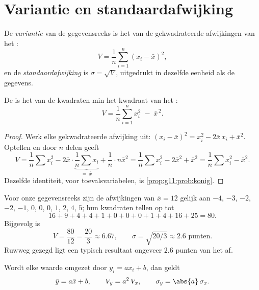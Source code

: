 \section{Variantie en standaardafwijking}

\begin{definition}\label{def:g11:stat:variance}
De \emph{variantie} van de gegevensreeks is het 
van de gekwadrateerde afwijkingen van het :
\[
V = \frac{1}{n}\sum_{i=1}^{n} (x_i - \bar x)^2,
\]
en de \emph{standaardafwijking} is
$\sigma = \sqrt{V}$, uitgedrukt in dezelfde eenheid als de gegevens.
\end{definition}

\begin{proposition}[Rekenformule]\label{prop:g11:stat:shortcut}
De  is het  van de kwadraten min het kwadraat van het
:
\[
V = \frac{1}{n}\sum_{i=1}^{n} x_i^2 \;-\; \bar x^{\,2}.
\]
\end{proposition}

\begin{proof}
Werk elke gekwadrateerde afwijking uit:
$(x_i - \bar x)^2 = x_i^2 - 2\bar x\, x_i + \bar x^2$. Optellen en door $n$
delen geeft
\[
V = \frac1n \sum x_i^2 - 2\bar x \cdot \underbrace{\frac1n \sum
x_i}_{=\ \bar x} + \frac1n \cdot n\bar x^2
= \frac1n\sum x_i^2 - 2\bar x^2 + \bar x^2
= \frac1n\sum x_i^2 - \bar x^2 .
\]
Dezelfde identiteit, voor toevalsvariabelen, is
\cref{prop:g11:prob:konig}.
\end{proof}

\begin{example}\label{ex:g11:stat:variance}
Voor onze gegevensreeks zijn de afwijkingen van $\bar x = 12$ gelijk aan
$-4$, $-3$, $-2$, $-2$, $-1$, $0$, $0$, $0$, $1$, $2$, $4$, $5$; hun
kwadraten tellen op tot
\[
16 + 9 + 4 + 4 + 1 + 0 + 0 + 0 + 1 + 4 + 16 + 25 = 80 .
\]
Bijgevolg is
\[
V = \frac{80}{12} = \frac{20}{3} \approx 6.67,
\qquad
\sigma = \sqrt{20/3} \approx 2.6 \text{ punten}.
\]
Ruwweg gezegd ligt een typisch resultaat ongeveer $2.6$ punten van het
 af.
\end{example}

\begin{proposition}\label{prop:g11:stat:affine}
Wordt elke waarde omgezet door $y_i = a x_i + b$, dan geldt
\[
\bar y = a \bar x + b,
\qquad
V_y = a^2\, V_x,
\qquad
\sigma_y = \abs{a}\,\sigma_x .
\]
\end{proposition}

